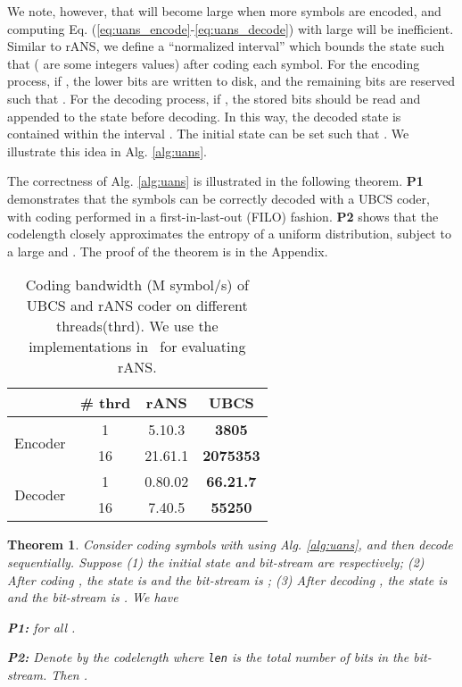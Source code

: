 \documentclass{article}
\newcommand{\ebar}[1]{{\tiny #1}}
\newtheorem{theorem}{Theorem}
\begin{document}
We note, however, that  will become large when more symbols are encoded, and computing Eq. (\ref{eq:uans_encode}-\ref{eq:uans_decode}) with large  will be inefficient. Similar to rANS, we define a ``normalized interval'' which bounds the state  such that  ( are some integers values) after coding each symbol. For the encoding process, if , the lower  bits are written to disk, and the remaining bits are reserved such that . For the decoding process, if , the stored  bits should be read and appended to the state before decoding. In this way, the decoded state is contained within the interval . The initial state can be set such that . We illustrate this idea in Alg. \ref{alg:uans}.

The correctness of Alg. \ref{alg:uans} is illustrated in the following theorem. \textbf{P1} demonstrates that the symbols can be correctly decoded with a UBCS coder, with coding performed in a first-in-last-out (FILO) fashion. \textbf{P2} shows that the codelength closely approximates the entropy of a uniform distribution, subject to a large  and . The proof of the theorem is in the Appendix.

\begin{wraptable}{r}{5.5cm}
\vspace{-19pt}
\centering
\small
\caption{Coding bandwidth (M symbol/s) of UBCS and rANS coder on different threads(thrd). We use the implementations in~\cite{ho2019compression} for evaluating rANS.}
\label{tab:coders}
\begin{tabular}{cccc}
\toprule
 & \# thrd & rANS & \textbf{UBCS} \\
\midrule
\multirow{2}{*}{Encoder} & 1 & 5.1\ebar{0.3} & \bf 380\ebar{5} \\
 & 16 & 21.6\ebar{1.1} & \bf 2075\ebar{353} \\
\midrule
\multirow{2}{*}{Decoder} & 1 & 0.8\ebar{0.02} & \bf 66.2\ebar{1.7} \\
 & 16 & 7.4\ebar{0.5} & \bf 552\ebar{50} \\
\bottomrule
\end{tabular}
\vspace{-30pt}
\end{wraptable} 

\begin{theorem}
Consider coding symbols  with  using Alg.  \ref{alg:uans}, and then decode  sequentially. Suppose (1) the initial state and bit-stream are  respectively; (2) After coding , the state is  and the bit-stream is ; (3) After decoding , the state is  and the bit-stream is . We have

\textbf{P1:}  for all .

\textbf{P2:} Denote by the codelength  where \texttt{len} is the total number of bits in the bit-stream. Then .
\label{the:uans}
\end{theorem}
\end{document}
